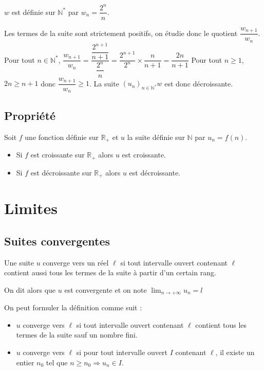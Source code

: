 \documentclass[french]{book}
\newcommand{\N}{\mathbb {N}}
\newcommand{\se}{\geq}
\newcommand{\limn}{\lim_{n\rightarrow +\infty}}
\newcommand{\suitep}[1][u]{\left( #1_{n} \right)_{n\in\N^{*}}}
\begin{document}
\begin{exemple}
$w$ est définie sur $\N^{*}$ par $w_{n}=\dfrac{2^{n}}{n}$.


Les termes de la suite sont strictement positifs, on étudie donc le quotient $\dfrac{w_{n+1}}{w_{n}}$.
 Pour tout $n\in\N^{*}$, $\dfrac{w_{n+1}}{w_{n}} = \dfrac{\dfrac{2^{n+1}}{n+1}}{\dfrac{2^{n}}{n}} = \dfrac{2^{n+1}}{2^{n}}\times\dfrac{n}{n+1} = \dfrac{2n}{n+1}$
 Pour tout $n\se 1$, $2n\se n+1$ donc $\dfrac{w_{n+1}}{w_{n}}\se 1$.
 La suite $\suitep{w}$ est donc décroissante.

\end{exemple}


\subsection{Propriété}
\begin{prop}
Soit $f$ une fonction définie sur $\mathbb{R}_+$ et $u$ la suite définie sur $\N$ par $u_{n}=f(n)$.
\begin{itemize}


\item Si $f$ est croissante sur $\mathbb{R}_+$ alors $u$ est croissante.
\item Si $f$ est décroissante sur $\mathbb{R}_+$ alors $u$ est décroissante.
\end{itemize}
\end{prop}


\section{Limites}
\subsection{Suites convergentes}
\begin{defn}
Une suite $u$ converge vers un réel $\ell$ si tout intervalle ouvert contenant $\ell$ contient aussi tous les termes de la suite à partir d'un certain rang.
\par On dit alors que $u$ est convergente et on note $\limn u_{n}=l$
\end{defn}

On peut formuler la définition comme suit :
\begin{itemize}
\item $u$ converge vers $\ell$ si tout intervalle ouvert contenant $\ell$ contient tous les termes de la suite sauf un nombre fini.
\item $u$ converge vers $\ell$ si pour tout intervalle ouvert $I$ contenant $\ell$, il existe un entier $n_{0}$ tel que $n\se n_0\Longrightarrow u_n\in I$.
\end{itemize}
\end{document}
